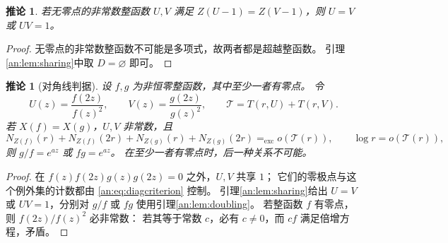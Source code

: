 \documentclass[11pt,a4paper,oneside,openany]{book}
\theoremstyle{lecture}
\newtheorem{corollary}[theorem]{推论}
\newcommand{\exceq}{\mathrel{=_{\mathrm{exc}}}}
\newcommand{\TT}{\mathcal T}
\numberwithin{equation}{section}
\begin{document}
\begin{samepage}
\begin{corollary}\label{an:cor:zero-free-share}
若无零点的非常数整函数 $U,V$ 满足 $Z(U-1)=Z(V-1)$，则 $U=V$ 或 $UV=1$。
\end{corollary}
\begin{proof}
无零点的非常数整函数不可能是多项式，故两者都是超越整函数。
引理\ref{an:lem:sharing}中取 $D=\varnothing$ 即可。
\end{proof}
\end{samepage}

\begin{corollary}[对角线判据]\label{an:cor:diagonal}
设 $f,g$ 为非恒零整函数，其中至少一者有零点。
令
\[
 U(z)=\frac{f(2z)}{f(z)^2},\qquad V(z)=\frac{g(2z)}{g(z)^2},
 \qquad \TT=T(r,U)+T(r,V).
\]
若 $X(f)=X(g)$，$U,V$ 非常数，且
\begin{equation}\label{an:eq:diagcriterion}
 N_{Z(f)}(r)+N_{Z(f)}(2r)+N_{Z(g)}(r)+N_{Z(g)}(2r)
 \exceq o(\TT(r)),\qquad \log r=o(\TT(r)),
\end{equation}
则 $g/f=e^{az}$ 或 $fg=e^{az}$。
在至少一者有零点时，后一种关系不可能。
\end{corollary}
\begin{proof}
在 $f(z)f(2z)g(z)g(2z)=0$ 之外，$U,V$ 共享 $1$；
它们的零极点与这个例外集的计数都由 \eqref{an:eq:diagcriterion} 控制。
引理\ref{an:lem:sharing}给出 $U=V$ 或 $UV=1$，分别对 $g/f$ 或 $fg$ 使用引理\ref{an:lem:doubling}。
若整函数 $f$ 有零点，则 $f(2z)/f(z)^2$ 必非常数：
若其等于常数 $c$，必有 $c\ne0$，而 $cf$ 满足倍增方程，矛盾。
\end{proof}
\end{document}
